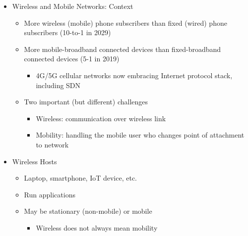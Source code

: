 \begin{itemize}

  \item Wireless and Mobile Networks: Context

    \begin{itemize}

      \item More wireless (mobile) phone subscribers than fixed (wired) phone subscribers (10-to-1 in 2029)

      \item More mobile-broadband connected devices than fixed-broadband connected devices (5-1 in 2019)

        \begin{itemize}

          \item 4G/5G cellular networks now embracing Internet protocol stack, including SDN

        \end{itemize}

      \item Two important (but different) challenges

        \begin{itemize}

          \item Wireless: communication over wireless link

          \item Mobility: handling the mobile user who changes point of attachment to network

        \end{itemize}

    \end{itemize}

  \item Wireless Hosts

    \begin{itemize}

      \item Laptop, smartphone, IoT device, etc.

      \item Run applications

      \item May be stationary (non-mobile) or mobile

        \begin{itemize}

          \item Wireless does not always mean mobility


\end{itemize}
\end{itemize}
\end{itemize}
